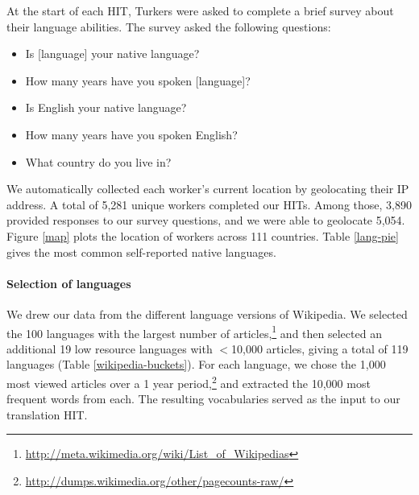\documentclass[11pt]{article}
\begin{document}
At the start of each HIT, Turkers were asked to complete a brief survey about their language abilities. The survey asked the following questions:
\begin{itemize}
\item Is [language] your native language? 
\item How many years have you spoken [language]? 
\item Is English your native language? 
\item How many years have you spoken English?
\item What country do you live in?
\end{itemize}
We automatically collected each worker's current location by geolocating their IP address.  A total of 5,281 unique workers completed our HITs.  Among those, 3,890 provided responses to our survey questions, and we were able to geolocate 5,054.  Figure \ref{map} plots the location of workers across 111 countries.  Table \ref{lang-pie} gives the most common self-reported native languages. 




\paragraph{Selection of languages}

We drew our data from the different language versions of Wikipedia.   We selected the 100 languages with the largest number of articles,\footnote{\url{http://meta.wikimedia.org/wiki/List_of_Wikipedias}} and then selected an additional 19 low resource languages with $<$10,000 articles, giving a total of 119 languages (Table \ref{wikipedia-buckets}). For each language, we chose the 1,000 most viewed articles over a 1 year period,\footnote{\url{http://dumps.wikimedia.org/other/pagecounts-raw/}} and extracted the 10,000 most frequent words from each. The resulting vocabularies served as the input to our translation HIT.
\end{document}
